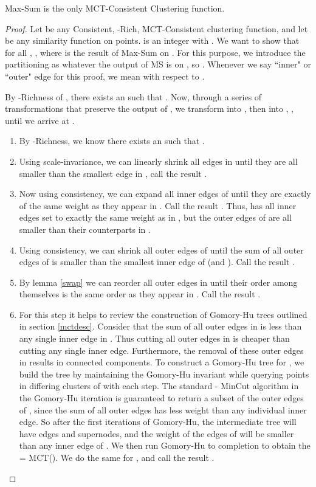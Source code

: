 \documentclass[twoside,11pt]{article}
\begin{document}
\begin{theorem} \label{mainms}
Max-Sum is the only MCT-Consistent Clustering function.
\end{theorem}
\begin{proof}
Let  be any Consistent, -Rich, MCT-Consistent clustering function, and let  be any similarity function on  points.  is an integer with . We want to show that for all , , where  is the result of  Max-Sum on . For this purpose, we introduce the partitioning  as whatever the output of MS is on , so . Whenever we say ``inner" or ``outer" edge for this proof, we mean with respect to .

By -Richness of , there exists an  such that . Now, through a series of transformations that preserve the output of , we transform  into , then  into , , until we arrive at .
\begin{enumerate}
	\item By -Richness, we know there exists an  such that .
	\item Using scale-invariance, we can linearly shrink all edges in  until they are all smaller than the smallest edge in , call the result .
	\item Now using consistency, we can expand all inner edges of  until they are exactly of the same weight as they appear in . Call the result . Thus,  has all inner edges set to exactly the same weight as in , but the outer edges of  are all smaller than their counterparts in .
	\item Using consistency, we can shrink all outer edges of  until the sum of all outer edges of  is smaller than the smallest inner edge of  (and ). Call the result .
	\item By lemma \ref{swap} we can reorder all outer edges in  until their order among themselves is the same order as they appear in . Call the result .	
	\item For this step it helps to review the construction of Gomory-Hu trees outlined in section \ref{mctdesc}. 
Consider that the sum of all outer edges in  is less than any single inner edge in . Thus cutting all outer edges in  is cheaper
than cutting any single inner edge. Furthermore, the removal of these outer edges in  results in  connected components. To construct a Gomory-Hu tree for , we build the tree by maintaining the Gomory-Hu invariant while querying points in differing clusters of  with each step. The standard - MinCut algorithm in the Gomory-Hu iteration is guaranteed to return a subset of the outer edges of , since the sum of all outer edges has less weight than any individual inner edge. So after the first  iterations of Gomory-Hu, the intermediate tree  will have  edges and  supernodes, and the weight of the edges of  will be smaller than any inner edge of . We then run Gomory-Hu to completion to obtain the  = MCT(). We do the same for , and call the result .


\end{enumerate}
\end{proof}
\end{document}
